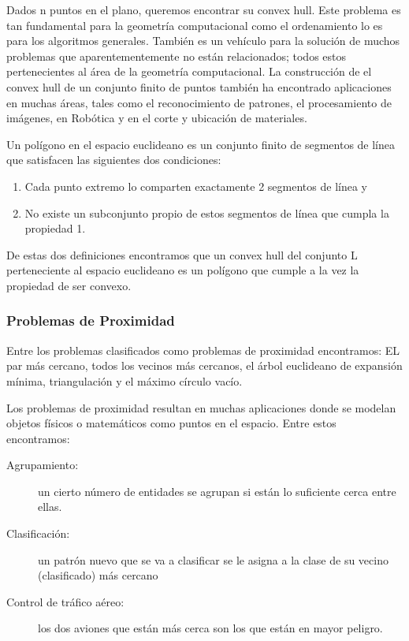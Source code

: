 \documentclass[final, 12pt letterpaper]{article}
\begin{document}
Dados n puntos en el plano, queremos encontrar su convex hull. Este problema es tan fundamental para la geometría computacional como el ordenamiento lo es para los algoritmos generales. También es un vehículo para la solución de muchos problemas que aparentementemente no están relacionados; todos estos pertenecientes al área de la geometría computacional. La construcción de el convex hull de un conjunto finito de puntos también ha encontrado aplicaciones en muchas áreas, tales como el reconocimiento de patrones, el procesamiento de imágenes, en Robótica y en el corte y ubicación de materiales.

Un polígono en el espacio euclideano es un conjunto finito de segmentos de línea que satisfacen las siguientes dos condiciones:
\begin{enumerate}
\item Cada punto extremo lo comparten exactamente 2 segmentos de línea y
\item No existe un subconjunto propio de estos segmentos de línea que cumpla la propiedad 1.
\end{enumerate}


De estas dos definiciones encontramos que un convex hull del conjunto L perteneciente al espacio euclideano es un polígono que cumple a la vez la propiedad de ser convexo.

\subsubsection{Problemas de Proximidad}

Entre los problemas clasificados como problemas de proximidad encontramos: EL par más cercano, todos los vecinos más cercanos, el árbol euclideano de expansión mínima, triangulación y el máximo círculo vacío.

Los problemas de proximidad resultan en muchas aplicaciones donde se modelan objetos físicos o matemáticos como puntos en el espacio. Entre estos encontramos:
\begin{description}

\item[Agrupamiento:] un cierto número de entidades se agrupan si están lo suficiente cerca entre ellas.

\item[Clasificación:] un patrón nuevo que se va a clasificar se le asigna a la clase de su vecino (clasificado) más cercano

\item[Control de tráfico aéreo:] los dos aviones que están más cerca son los que están en mayor peligro.
\end{description}
\end{document}
